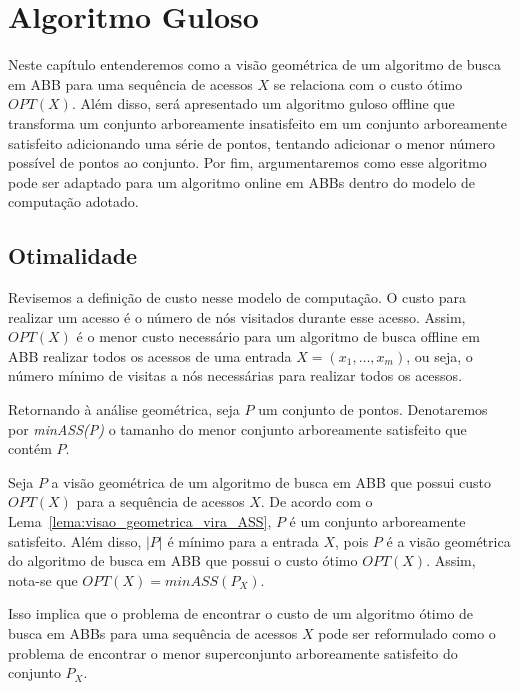 
\chapter{Algoritmo Guloso}
\label{cap:algoritmo-guloso}

Neste capítulo entenderemos como a visão geométrica de um algoritmo de busca em ABB para uma sequência de acessos $X$ se relaciona com o custo ótimo $OPT(X)$. Além disso, será apresentado um algoritmo guloso offline que transforma um conjunto arboreamente insatisfeito em um conjunto arboreamente satisfeito adicionando uma série de pontos, tentando adicionar o menor número possível de pontos ao conjunto. Por fim, argumentaremos como esse algoritmo pode ser adaptado para um algoritmo online em ABBs dentro do modelo de computação adotado.

\section{Otimalidade} 

Revisemos a definição de custo nesse modelo de computação. O custo para realizar um acesso é o número de nós visitados durante esse acesso. Assim, $OPT(X)$ é o menor custo necessário para um algoritmo de busca offline em ABB realizar todos os acessos de uma entrada $X = (x_{1},\ldots,x_{m})$, ou seja, o número mínimo de visitas a nós necessárias para realizar todos os acessos.

Retornando à análise geométrica, seja $P$ um conjunto de pontos. Denotaremos por \textit{minASS(P)} o tamanho do menor conjunto arboreamente satisfeito que contém $P$. 

Seja $P$ a visão geométrica de um algoritmo de busca em ABB que possui custo $OPT(X)$ para a sequência de acessos $X$. De acordo com o Lema~\ref{lema:visao_geometrica_vira_ASS}, $P$ é um conjunto arboreamente satisfeito. Além disso, $|P|$ é mínimo para a entrada $X$, pois $P$ é a visão geométrica do algoritmo de busca em ABB que possui o custo ótimo $OPT(X)$. Assim, nota-se que $OPT(X) = minASS(P_X)$.

Isso implica que o problema de encontrar o custo de um algoritmo ótimo de busca em ABBs para uma sequência de acessos $X$ pode ser reformulado como o problema de encontrar o menor superconjunto arboreamente satisfeito do conjunto $P_X$.

